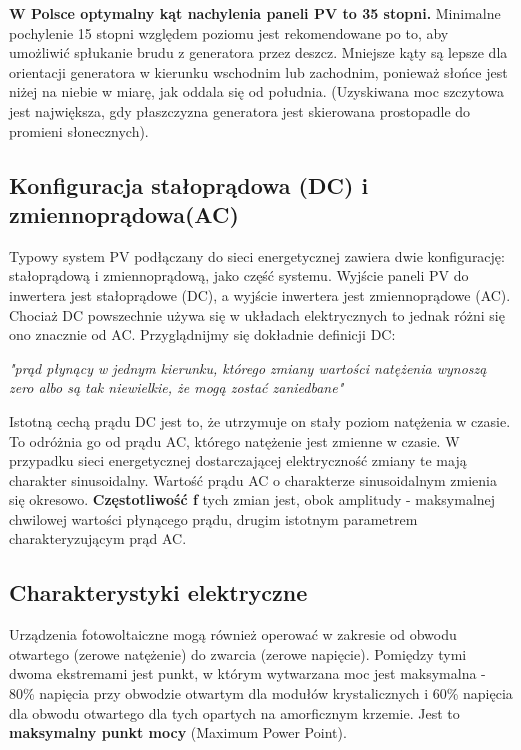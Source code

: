 \documentclass[12pt,a4paper]{article}
\begin{document}
\textbf{W Polsce optymalny kąt nachylenia paneli PV to 35 stopni.} Minimalne 
pochylenie 15 stopni względem poziomu jest rekomendowane po to, aby 
umożliwić spłukanie brudu z generatora przez deszcz. Mniejsze kąty są 
lepsze dla orientacji generatora w kierunku wschodnim lub zachodnim, 
ponieważ słońce jest niżej na niebie w miarę, jak oddala się od 
południa. (Uzyskiwana moc szczytowa jest największa, gdy płaszczyzna 
generatora jest skierowana prostopadle do promieni słonecznych). 

\subsection{Konfiguracja stałoprądowa (DC) i zmiennoprądowa(AC)}

Typowy system PV podłączany do sieci energetycznej zawiera dwie 
konfigurację: stałoprądową i zmiennoprądową, jako część systemu. Wyjście 
paneli PV do inwertera jest stałoprądowe (DC), a wyjście inwertera jest 
zmiennoprądowe (AC). Chociaż DC powszechnie używa się w układach 
elektrycznych to jednak różni się ono znacznie od AC. Przyglądnijmy się 
dokładnie definicji DC: 

\textit{"prąd płynący w jednym kierunku, którego zmiany wartości 
natężenia wynoszą zero albo są tak niewielkie, że mogą zostać 
zaniedbane"}

Istotną cechą prądu DC jest to, że utrzymuje on stały poziom natężenia w 
czasie. To odróżnia go od prądu AC, którego natężenie jest zmienne w 
czasie. W przypadku sieci energetycznej dostarczającej elektryczność 
zmiany te mają charakter sinusoidalny. Wartość prądu AC o charakterze 
sinusoidalnym zmienia się okresowo. \textbf{Częstotliwość f} tych 
zmian jest, obok amplitudy - maksymalnej chwilowej wartości płynącego 
prądu, drugim istotnym parametrem charakteryzującym prąd AC. 

\subsection{Charakterystyki elektryczne}


Urządzenia fotowoltaiczne mogą również operować w zakresie od obwodu 
otwartego (zerowe natężenie) do zwarcia (zerowe napięcie). Pomiędzy tymi 
dwoma ekstremami jest punkt, w którym wytwarzana moc jest maksymalna - 
80\% napięcia przy obwodzie otwartym dla modułów krystalicznych i 60\% 
napięcia dla obwodu otwartego dla tych opartych na amorficznym krzemie. 
Jest to \textbf{maksymalny punkt mocy} (Maximum Power Point). 
\end{document}
